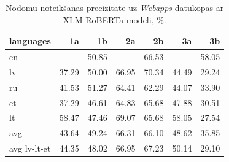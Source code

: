 \begin{table}[htbp]
  \centering
  \caption{Nodomu noteikšanas precizitāte uz \textit{Webapps} datukopas ar XLM-RoBERTa modeli, \%.}
    \begin{tabular}{lrrrrrr}\toprule
    languages & 1a & 1b & 2a & 2b & 3a & 3b \\\midrule
    en    &   --    & \cellcolor[rgb]{ .965,  .973,  .992}50.85 &  --   & \cellcolor[rgb]{ .475,  .627,  .82}66.53 &   --    & \cellcolor[rgb]{ .737,  .812,  .914}58.05 \\
    lv    & \cellcolor[rgb]{ .976,  .659,  .671}37.29 & \cellcolor[rgb]{ .988,  .988,  1}50.00 & \cellcolor[rgb]{ .463,  .62,  .816}66.95 & \cellcolor[rgb]{ .353,  .541,  .776}70.34 & \cellcolor[rgb]{ .984,  .843,  .855}44.49 & \cellcolor[rgb]{ .973,  .455,  .463}29.24 \\
    ru    & \cellcolor[rgb]{ .98,  .769,  .78}41.53 & \cellcolor[rgb]{ .949,  .961,  .988}51.27 & \cellcolor[rgb]{ .541,  .675,  .843}64.41 & \cellcolor[rgb]{ .608,  .722,  .867}62.29 & \cellcolor[rgb]{ .98,  .835,  .843}44.07 & \cellcolor[rgb]{ .976,  .573,  .58}33.90 \\
    et    & \cellcolor[rgb]{ .976,  .659,  .671}37.29 & \cellcolor[rgb]{ .984,  .898,  .91}46.61 & \cellcolor[rgb]{ .525,  .663,  .839}64.83 & \cellcolor[rgb]{ .502,  .647,  .831}65.68 & \cellcolor[rgb]{ .984,  .933,  .945}47.88 & \cellcolor[rgb]{ .973,  .486,  .494}30.51 \\
    lt    & \cellcolor[rgb]{ .725,  .804,  .91}58.47 & \cellcolor[rgb]{ .984,  .922,  .933}47.46 & \cellcolor[rgb]{ .396,  .573,  .792}69.07 & \cellcolor[rgb]{ .502,  .647,  .831}65.68 & \cellcolor[rgb]{ .737,  .812,  .914}58.05 & \cellcolor[rgb]{ .973,  .412,  .42}27.54 \\\midrule
    avg   & \cellcolor[rgb]{ .98,  .824,  .835}43.64 & \cellcolor[rgb]{ .984,  .969,  .976}49.24 & \cellcolor[rgb]{ .482,  .631,  .824}66.31 & \cellcolor[rgb]{ .486,  .635,  .824}66.10 & \cellcolor[rgb]{ .984,  .949,  .961}48.62 & \cellcolor[rgb]{ .976,  .624,  .631}35.85 \\
    avg lv-lt-et & \cellcolor[rgb]{ .98,  .843,  .851}44.35 & \cellcolor[rgb]{ .984,  .937,  .945}48.02 & \cellcolor[rgb]{ .463,  .62,  .816}66.95 & \cellcolor[rgb]{ .451,  .612,  .812}67.23 & \cellcolor[rgb]{ .984,  .988,  1}50.14 & \cellcolor[rgb]{ .973,  .451,  .459}29.10 \\\bottomrule
    \end{tabular}%
  \label{tab:webapps-xml}%
\end{table}%



